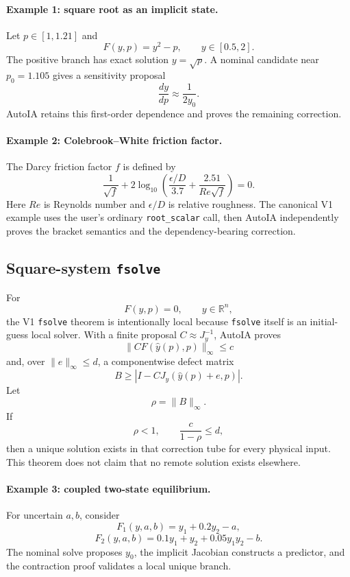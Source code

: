 \documentclass[11pt]{article}
\begin{document}
\paragraph{Example 1: square root as an implicit state.}
Let \(p\in[1,1.21]\) and
\[
  F(y,p)=y^2-p,
  \qquad y\in[0.5,2].
\]
The positive branch has exact solution \(y=\sqrt{p}\).  A nominal candidate near
\(p_0=1.105\) gives a sensitivity proposal
\[
  \frac{dy}{dp}\approx \frac{1}{2y_0}.
\]
AutoIA retains this first-order dependence and proves the remaining correction.

\paragraph{Example 2: Colebrook--White friction factor.}
The Darcy friction factor \(f\) is defined by
\[
  \frac{1}{\sqrt f}
  +2\log_{10}\!\left(
      \frac{\epsilon/D}{3.7}
      +\frac{2.51}{Re\sqrt f}
    \right)=0.
\]
Here \(Re\) is Reynolds number and \(\epsilon/D\) is relative roughness.
The canonical V1 example uses the user's ordinary \texttt{root\_scalar} call,
then AutoIA independently proves the bracket semantics and the dependency-bearing
correction.

\subsection{Square-system \texttt{fsolve}}

For
\[
  F(y,p)=0,
  \qquad y\in\mathbb{R}^n,
\]
the V1 \texttt{fsolve} theorem is intentionally local because \texttt{fsolve}
itself is an initial-guess local solver.  With a finite proposal
\(C\approx J_y^{-1}\), AutoIA proves
\[
  \|CF(\widehat y(p),p)\|_\infty\le c
\]
and, over \(\|e\|_\infty\le d\), a componentwise defect matrix
\[
  B\ge |I-CJ_y(\widehat y(p)+e,p)|.
\]
Let
\[
  \rho=\|B\|_\infty.
\]
If
\[
  \rho<1,
  \qquad
  \frac{c}{1-\rho}\le d,
\]
then a unique solution exists in that correction tube for every physical input.
This theorem does not claim that no remote solution exists elsewhere.

\paragraph{Example 3: coupled two-state equilibrium.}
For uncertain \(a,b\), consider
\[
  F_1(y,a,b)=y_1+0.2y_2-a,
\]
\[
  F_2(y,a,b)=0.1y_1+y_2+0.05y_1y_2-b.
\]
The nominal solve proposes \(y_0\), the implicit Jacobian constructs a predictor,
and the contraction proof validates a local unique branch.
\end{document}
